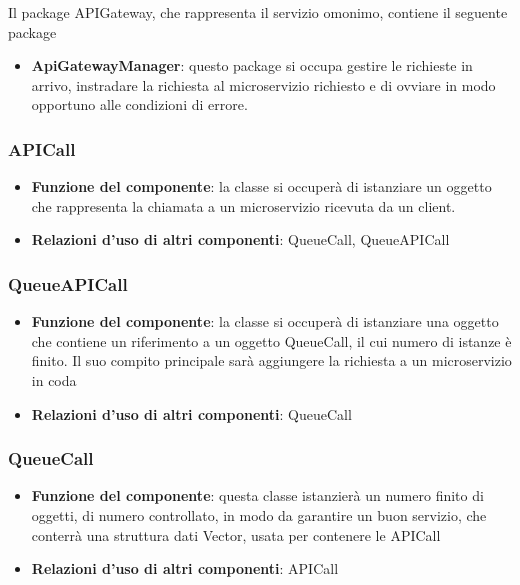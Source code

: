 Il package APIGateway, che rappresenta il servizio omonimo, contiene il seguente package
\begin{itemize}
	\item \textbf{ApiGatewayManager}: questo package si occupa gestire le richieste in arrivo, instradare la richiesta al microservizio richiesto e di ovviare in modo opportuno alle condizioni di errore.
\end{itemize}

\subsubsection{APICall}
\begin{itemize}
	\item \textbf{Funzione del componente}: la classe si occuper\`{a} di istanziare un oggetto che rappresenta la chiamata a un microservizio ricevuta da un client.
	\item \textbf{Relazioni d'uso di altri componenti}: QueueCall, QueueAPICall
\end{itemize}

\subsubsection{QueueAPICall}
\begin{itemize}
	\item \textbf{Funzione del componente}: la classe si occuper\`{a} di istanziare una oggetto che contiene un riferimento a un oggetto QueueCall, il cui numero di istanze \`{e} finito. Il suo compito principale sar\`{a} aggiungere la richiesta a un microservizio in coda
	\item \textbf{Relazioni d'uso di altri componenti}: QueueCall
\end{itemize}

\subsubsection{QueueCall}
\begin{itemize}
	\item \textbf{Funzione del componente}: questa classe istanzier\`{a} un numero finito di oggetti, di numero controllato, in modo da garantire un buon servizio, che conterr\`{a} una struttura dati Vector, usata per contenere le APICall
	\item \textbf{Relazioni d'uso di altri componenti}: APICall
\end{itemize}

